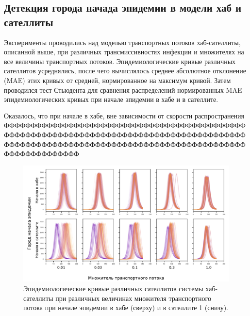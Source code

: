 \documentclass[a4paper,12pt]{article} %
\begin{document}
\subsection{Детекция города начада эпидемии в модели хаб и сателлиты}

Эксперименты проводились над моделью транспортных потоков хаб-сателлиты, описанной выше, при различных трансмиссивностях инфекции и множителях на все величины транспортных потоков. Эпидемиологические кривые различных сателлитов усреднялись, после чего вычислялось среднее абсолютное отклонение (MAE) этих кривых от средней, нормированное на максимум кривой. Затем проводился тест Стьюдента для сравнения распределений нормированных MAE эпидемиологических кривых при начале эпидемии в хабе и в сателлите.

 Оказалось, что при начале в хабе, вне зависимости от скорости распространения ФФФФФФФФФФФФФФФФФФФФФФФФФФФФФФФФФФФФФФФФФФФФФФФФФФФФФФФФФФФФФФФФФФФФФФФФФФФФФФФФФФФФФФФФФФФФФФФФФФФФФФФФФФФФФФФФФФФФФФФФФФФФФФФФФФФФФФФФФФФФФФФФФФФФФ
\begin{figure}[H]
    \centering
    \includegraphics[width=\linewidth]{images/diffsatellites_demos.pdf}
    \caption{Эпидемиологические кривые различных сателлитов системы хаб-сателлиты при различных величинах множителя транспортного потока при начале эпидемии в хабе (сверху) и в сателлите 1 (снизу).}
    \label{pic:diffsatellites_demos}
\end{figure}
\end{document}
